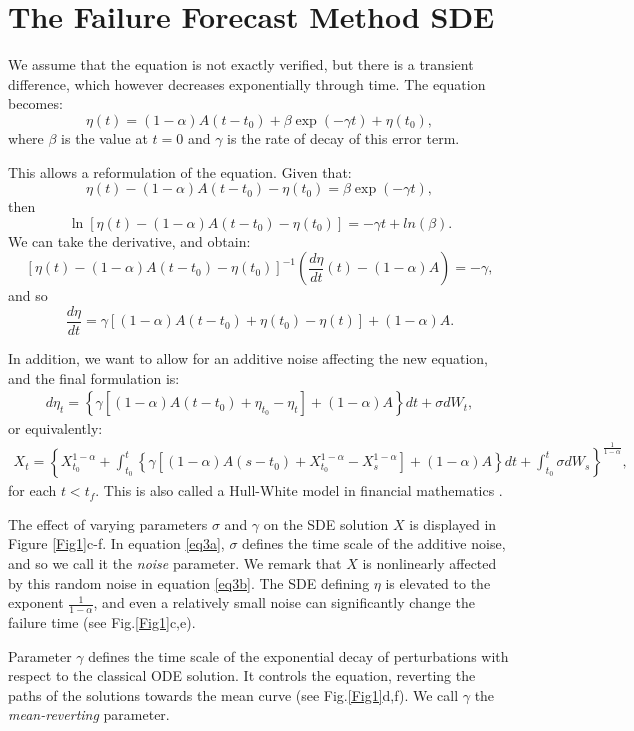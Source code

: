 \documentclass{article}
\begin{document}
\section{The Failure Forecast Method SDE}
We assume that the equation is not exactly verified, but there is a transient difference, which however decreases exponentially through time. The equation becomes:
$$\eta(t)=(1-\alpha)A(t-t_0) +\beta\exp(-\gamma t)+\eta(t_0),$$
where $\beta$ is the value at $t=0$ and $\gamma$ is the rate of decay of this error term.

This allows a reformulation of the equation. Given that:
$$\eta(t)-(1-\alpha)A(t-t_0)-\eta(t_0)=\beta\exp(-\gamma t),$$
then
$$\ln\left[\eta(t)-(1-\alpha)A(t-t_0)-\eta(t_0)\right]=-\gamma t+ln(\beta).$$
We can take the derivative, and obtain:
$$\left[\eta(t)-(1-\alpha)A(t-t_0)-\eta(t_0)\right]^{-1}\left(\frac{d\eta}{dt}(t)-(1-\alpha)A\right)=-\gamma,$$
and so
$$\frac{d\eta}{dt}=\gamma\left[(1-\alpha)A(t-t_0)+\eta(t_0)-\eta(t)\right]+(1-\alpha)A.$$

In addition, we want to allow for an additive noise affecting the new equation, and the final formulation is:
\begin{align}\label{eq3a}
d\eta_t=\left\{\gamma\left[(1-\alpha)A(t-t_0)+\eta_{t_0}-\eta_t\right]+(1-\alpha)A\right\}dt+\sigma dW_t,
\end{align}
or equivalently:
\begin{align}\label{eq3b}
X_t=\left\{X_{t_0}^{1-\alpha}+\int_{t_0}^t\left\{\gamma\left[(1-\alpha)A(s-t_0)+X_{t_0}^{1-\alpha}-X_s^{1-\alpha}\right]+(1-\alpha)A\right\}dt+\int_{t_0}^t\sigma dW_s\right\}^{\frac{1}{1-\alpha}},
\end{align}
for each $t<t_f$. This is also called a Hull-White model in financial mathematics \citep{HullWhite1990}.

The effect of varying parameters $\sigma$ and $\gamma$ on the SDE solution $X$ is displayed in Figure \ref{Fig1}c-f. In equation \ref{eq3a}, $\sigma$ defines the time scale of the additive noise, and so we call it the {\it noise} parameter. We remark that $X$ is nonlinearly affected by this random noise in equation \ref{eq3b}. The SDE defining $\eta$ is elevated to the exponent $\frac{1}{1-\alpha}$, and even a relatively small noise can significantly change the failure time (see Fig.\ref{Fig1}c,e).

Parameter $\gamma$ defines the time scale of the exponential decay of perturbations with respect to the classical ODE solution. It controls the equation, reverting the paths of the solutions towards the mean curve (see Fig.\ref{Fig1}d,f). We call $\gamma$ the {\it mean-reverting} parameter.
\end{document}
